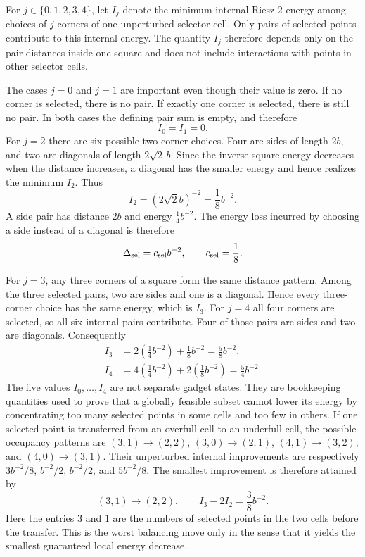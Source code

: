 \documentclass[12pt,a4paper]{article}
\begin{document}
For $j\in\{0,1,2,3,4\}$, let $I_j$ denote the minimum internal Riesz $2$-energy among choices of $j$ corners of one unperturbed selector cell.  Only pairs of selected points contribute to this internal energy.  The quantity $I_j$ therefore depends only on the pair distances inside one square and does not include interactions with points in other selector cells.

The cases $j=0$ and $j=1$ are important even though their value is zero.  If no corner is selected, there is no pair.  If exactly one corner is selected, there is still no pair.  In both cases the defining pair sum is empty, and therefore
\[
 I_0=I_1=0.
\]
For $j=2$ there are six possible two-corner choices.  Four are sides of length $2b$, and two are diagonals of length $2\sqrt2\,b$.  Since the inverse-square energy decreases when the distance increases, a diagonal has the smaller energy and hence realizes the minimum $I_2$.  Thus
\begin{equation}\label{eq:Idiag}
 I_2=(2\sqrt2 b)^{-2}=\frac1{8}b^{-2}.
\end{equation}
A side pair has distance $2b$ and energy $\frac14b^{-2}$.  The energy loss incurred by choosing a side instead of a diagonal is therefore
\begin{equation}\label{eq:csel}
 \Delta_{\rm sel}=c_{\rm sel}b^{-2},\qquad
 c_{\rm sel}=\frac18.
\end{equation}

For $j=3$, any three corners of a square form the same distance pattern.  Among the three selected pairs, two are sides and one is a diagonal.  Hence every three-corner choice has the same energy, which is $I_3$.  For $j=4$ all four corners are selected, so all six internal pairs contribute.  Four of those pairs are sides and two are diagonals.  Consequently
\begin{align}
 I_3&=2\left(\frac14b^{-2}\right)+\frac18b^{-2}
     =\frac58b^{-2},\label{eq:I3}\\
 I_4&=4\left(\frac14b^{-2}\right)+2\left(\frac18b^{-2}\right)
     =\frac54b^{-2}.
\end{align}
The five values $I_0,\ldots,I_4$ are not separate gadget states.  They are bookkeeping quantities used to prove that a globally feasible subset cannot lower its energy by concentrating too many selected points in some cells and too few in others.  If one selected point is transferred from an overfull cell to an underfull cell, the possible occupancy patterns are $(3,1)\to(2,2)$, $(3,0)\to(2,1)$, $(4,1)\to(3,2)$, and $(4,0)\to(3,1)$.  Their unperturbed internal improvements are respectively $3b^{-2}/8$, $b^{-2}/2$, $b^{-2}/2$, and $5b^{-2}/8$.  The smallest improvement is therefore attained by
\begin{equation}\label{eq:balance-gap}
 (3,1)\longrightarrow(2,2),\qquad
 I_3-2I_2=\frac38b^{-2}.
\end{equation}
Here the entries $3$ and $1$ are the numbers of selected points in the two cells before the transfer.  This is the worst balancing move only in the sense that it yields the smallest guaranteed local energy decrease.
\end{document}
